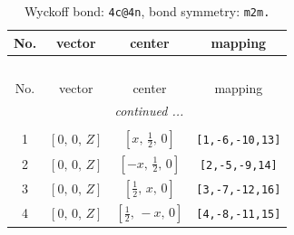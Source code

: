 \documentclass[fleqn,8pt]{jsarticle}
\begin{document}
\renewcommand{\arraystretch}{1.2}
\begin{longtable}{cccc}
\caption{Wyckoff bond: {\tt 4c@4n}, bond symmetry: {\tt m2m.}}
 \\
 \hline \hline
No. & vector & center & mapping \\ \hline \endfirsthead

\multicolumn{3}{l}{\tablename\ \thetable{}} \\
 \hline \hline
No. & vector & center & mapping \\ \hline \endhead

 \hline \hline
\multicolumn{3}{r}{\footnotesize\it continued ...} \\ \endfoot

 \hline \hline
\multicolumn{3}{r}{} \\ \endlastfoot

1 & $\left[ 0,\, 0,\, Z \right]$ & $\left[ x,\, \frac{1}{2},\, 0 \right]$ & {\tt [1,-6,-10,13]} \\ \hline
2 & $\left[ 0,\, 0,\, Z \right]$ & $\left[ - x,\, \frac{1}{2},\, 0 \right]$ & {\tt [2,-5,-9,14]} \\ \hline
3 & $\left[ 0,\, 0,\, Z \right]$ & $\left[ \frac{1}{2},\, x,\, 0 \right]$ & {\tt [3,-7,-12,16]} \\ \hline
4 & $\left[ 0,\, 0,\, Z \right]$ & $\left[ \frac{1}{2},\, - x,\, 0 \right]$ & {\tt [4,-8,-11,15]} \\
\end{longtable}
\renewcommand{\arraystretch}{1.2}
\end{document}
